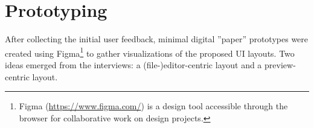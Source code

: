 
%
\chapter{Prototyping}
\label{chap:prototyping} 

After collecting the initial user feedback, minimal digital ''paper'' prototypes were created using Figma\footnote{Figma (\url{https://www.figma.com/}) is a design tool accessible through the browser for collaborative work on design projects.} to gather visualizations of the proposed UI layouts.
Two ideas emerged from the interviews: a (file-)editor-centric layout and a preview-centric layout.
